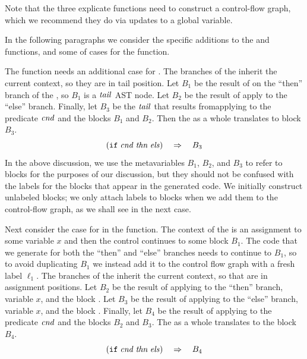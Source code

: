 \documentclass[11pt]{book}
\begin{document}
Note that the three explicate functions need to construct a
control-flow graph, which we recommend they do via updates to a global
variable.

In the following paragraphs we consider the specific additions to the
 and  functions, and some
of cases for the  function.

The  function needs an additional case for
. The branches of the  inherit the current context, so
they are in tail position.  Let $B_1$ be the result of
 on the ``then'' branch of the , so $B_1$
is a $\mathit{tail}$ AST node.  Let $B_2$ be the result of apply
 to the ``else'' branch. Finally, let $B_3$ be
the $\mathit{tail}$ that results fromapplying  to the
predicate $\mathit{cnd}$ and the blocks $B_1$ and $B_2$.  Then the
 as a whole translates to block $B_3$.
\[
    (\texttt{if}\; \mathit{cnd}\; \mathit{thn}\; \mathit{els}) \quad\Rightarrow\quad B_3
\]
In the above discussion, we use the metavariables $B_1$, $B_2$, and
$B_3$ to refer to blocks for the purposes of our discussion, but they
should not be confused with the labels for the blocks that appear in
the generated code. We initially construct unlabeled blocks; we only
attach labels to blocks when we add them to the control-flow graph, as
we shall see in the next case.

Next consider the case for  in the 
function. The context of the  is an assignment to some
variable $x$ and then the control continues to some block $B_1$.  The
code that we generate for both the ``then'' and ``else'' branches
needs to continue to $B_1$, so to avoid duplicating $B_1$ we instead
add it to the control flow graph with a fresh label $\ell_1$. The
branches of the  inherit the current context, so that are in
assignment positions.  Let $B_2$ be the result of applying
 to the ``then'' branch, variable $x$, and the
block .  Let $B_3$ be the result of applying
 to the ``else'' branch, variable $x$, and the
block . Finally, let $B_4$ be the result of applying
 to the predicate $\mathit{cnd}$ and the blocks
$B_2$ and $B_3$. The  as a whole translates to the block
$B_4$.
\[
(\texttt{if}\; \mathit{cnd}\; \mathit{thn}\; \mathit{els}) \quad\Rightarrow\quad B_4
\]
\end{document}
